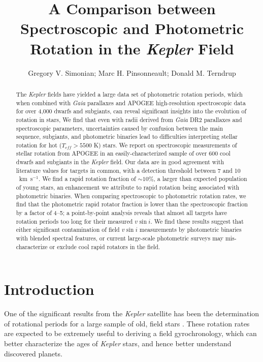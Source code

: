 \documentclass[manuscript]{aastex6}
\newcommand{\vsini}{\ensuremath{v \sin i}}
\newcommand{\Kepler}{\mbox{\textit{Kepler}}}
\newcommand{\Gaia}{\mbox{\textit{Gaia}}}
\newcommand{\Teff}{\ensuremath{T_{eff}}}
\newcommand{\kms}{\textrm{~km~s}\ensuremath{^{-1}}}
\begin{document}
\title{A Comparison between Spectroscopic and Photometric Rotation in the
\Kepler{} Field}
\author{Gregory V. Simonian; Marc H. Pinsonneault; Donald M. Terndrup}

\begin{abstract}
    The \Kepler{} fields have yielded a large data set of photometric rotation
    periods, which when combined with \Gaia{} parallaxes and APOGEE
    high-resolution spectroscopic data for over 4,000 dwarfs and subgiants, 
    can reveal significant insights into the evolution of rotation in stars, 
    We find that even with radii derived from \Gaia{} DR2 parallaxes and
    spectroscopic parameters, uncertainties caused by confusion between the
    main sequence, subgiants, and photometric binaries lead to difficulties
    interpreting stellar rotation for hot (\(\Teff > 5500\) K) stars. We 
    report on spectroscopic measurements of stellar rotation from APOGEE in an
    easily-characterized sample of over 600 cool dwarfs and subgiants in the
    \Kepler{} field. Our data are in good agreement with literature values for
    targets in common, with a detection threshold between 7 and 10 \kms. We
    find a rapid rotation fraction of \(\sim 10\%\), a larger than expected
    population of young stars, an enhancement we attribute to rapid rotation
    being associated with photometric binaries. When comparing spectroscopic 
    to photometric rotation rates, we find that the photometric rapid rotator 
    fraction is lower than the spectroscopic fraction by a factor of 4--5; a 
    point-by-point analysis reveals that almost all targets have rotation 
    periods too long for their measured \vsini{}. We find these results 
    suggest that either significant contamination of field \vsini{}
    measurements by photometric binaries with blended spectral features, or 
    current large-scale photometric surveys may mis-characterize or exclude 
    cool rapid rotators in the field. 
\end{abstract}

\section{Introduction}

One of the significant results from the \Kepler{} satellite has been the
determination of rotational periods for a large sample of old, field stars
\citep{Basri11,Affer12,Nielsen13,Reinhold13,McQuillan14,Garcia14}.
These rotation rates are expected to be extremely useful to deriving a field
gyrochronology, which can better characterize the ages of
\Kepler{} stars, and hence better understand discovered planets.
\end{document}
